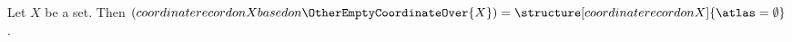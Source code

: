 

\begin{proposition}\label{discovery_requires_provider_identity}
    Let $X$ be a set.
    Then $(coordinate record on X based on \OtherEmptyCoordinateOver{X})=
        \structure[coordinate record on X]{\atlas=\emptyset}$.
\end{proposition}
